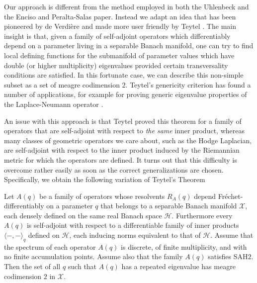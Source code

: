 Our approach is different from the method employed in both the Uhlenbeck and the Enciso and Peralta-Salas paper. Instead we adapt an idea that has been pioneered by de Verdière \cite{Verdière1988} and made more user friendly by Teytel \cite{Teytel1999}. The main insight is that, given a family of self-adjoint operators which differentiably depend on a parameter living in a separable Banach manifold, one can try to find local defining functions for the submanifold of parameter values which have double (or higher multiplicity) eigenvalues provided certain transversality conditions are satisfied. In this fortunate case, we can describe this non-simple subset as a set of meagre codimension $2$. Teytel's genericity criterion has found a number of applications, for example for proving generic eigenvalue properties of the Laplace-Neumann operator \cite{GomesMarrocos2019}.\par
An issue with this approach is that Teytel proved this theorem for a family of operators that are self-adjoint with respect to \emph{the same} inner product, whereas many classes of geometric operators we care about, such as the Hodge Laplacian, are self-adjoint with respect to the inner product induced by the Riemannian metric for which the operators are defined. It turns out that this difficulty is overcome rather easily as soon as the correct generalizations are chosen. Specifically, we obtain the following variation of Teytel's Theorem \cite[Theorem A]{Teytel1999}

\begin{thm}
    \label{theorem: meagre codimension criterion}
Let $A(q)$ be a family of operators whose resolvents $R_{A}(q)$ depend Fr\'echet-differentiably on a parameter $q$ that belongs to a separable Banach manifold $\mathcal{X}$, each densely defined on the same real Banach space $\mathcal{H}$. Furthermore every $A(q)$ is self-adjoint with respect to a differentiable family of inner products $\langle-,-\rangle_q$ defined on $\mathcal{H}$, each inducing norms equivalent to that of $\mathcal{H}$. Assume that the spectrum of each operator $A(q)$ is discrete, of finite multiplicity, and with no finite accumulation points. Assume also that the family $A(q)$ satisfies SAH$2$. Then the set of all $q$ such that $A(q)$ has a repeated eigenvalue has meagre codimension $2$ in $\mathcal{X}$.
\end{thm}


